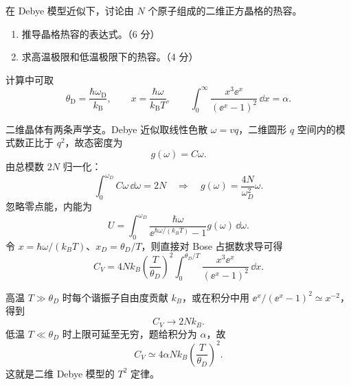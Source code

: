 \begin{question}[10 分]
在 Debye 模型近似下，讨论由 $N$ 个原子组成的二维正方晶格的热容。
\begin{enumerate}
  \item 推导晶格热容的表达式。（6 分）
  \item 求高温极限和低温极限下的热容。（4 分）
\end{enumerate}
计算中可取
\[
  \theta_{\mathrm D}=\frac{\hbar\omega_{\mathrm D}}{k_{\mathrm B}},\qquad
  x=\frac{\hbar\omega}{k_{\mathrm B}T},\qquad
  \int_0^\infty\frac{x^3\ee^x}{(\ee^x-1)^2}\,\dd x=\alpha.
\]


\begin{solution}
二维晶体有两条声学支。Debye 近似取线性色散 $\omega=vq$，二维圆形 $q$ 空间内的模式数正比于 $q^2$，故态密度为
\[
 g(\omega)=C\omega.
\]
由总模数 $2N$ 归一化：
\[
 \int_0^{\omega_D}C\omega\,\dd\omega=2N
 \quad\Longrightarrow\quad
 \boxed{g(\omega)=\frac{4N}{\omega_D^2}\omega.}
\]
忽略零点能，内能为
\[
 U=\int_0^{\omega_D}
 \frac{\hbar\omega}{\ee^{\hbar\omega/(k_BT)}-1}g(\omega)\,\dd\omega.
\]
令 $x=\hbar\omega/(k_BT)$、$x_D=\theta_D/T$，则直接对 Bose 占据数求导可得
\[
 \boxed{C_V=4Nk_B\left(\frac{T}{\theta_D}\right)^2
 \int_0^{\theta_D/T}
 \frac{x^3\ee^x}{(\ee^x-1)^2}\,\dd x.}
\]

高温 $T\gg\theta_D$ 时每个谐振子自由度贡献 $k_B$，或在积分中用
$\ee^x/(\ee^x-1)^2\simeq x^{-2}$，得到
\[
 \boxed{C_V\longrightarrow2Nk_B.}
\]
低温 $T\ll\theta_D$ 时上限可延至无穷，题给积分为 $\alpha$，故
\[
 \boxed{C_V\simeq4\alpha Nk_B
 \left(\frac{T}{\theta_D}\right)^2.}
\]
这就是二维 Debye 模型的 $T^2$ 定律。
\end{solution}
\end{question}
